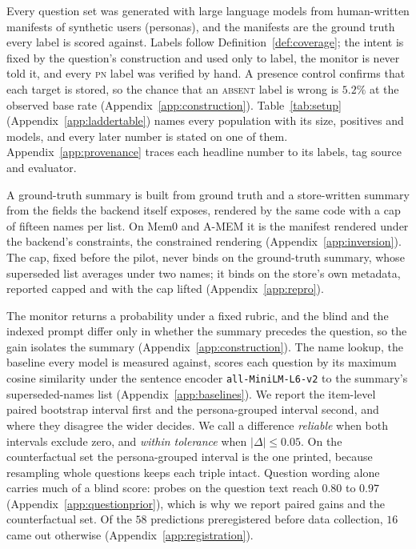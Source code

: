 \documentclass{article}
\newcommand{\absent}{\textsc{absent}}
\newcommand{\pn}{\textsc{pn}}
\begin{document}
Every question set was generated with large language models from human-written manifests of synthetic users (personas), and the manifests are the ground truth every label is scored against.
Labels follow Definition~\ref{def:coverage}; the intent is fixed by the question's construction and used only to label, the monitor is never told it, and every \pn{} label was verified by hand.
A presence control confirms that each target is stored, so the chance that an \absent{} label is wrong is $5.2\%$ at the observed base rate (Appendix~\ref{app:construction}).
Table~\ref{tab:setup} (Appendix~\ref{app:laddertable}) names every population with its size, positives and models, and every later number is stated on one of them.
Appendix~\ref{app:provenance} traces each headline number to its labels, tag source and evaluator.


A ground-truth summary is built from ground truth and a store-written summary from the fields the backend itself exposes, rendered by the same code with a cap of fifteen names per list.
On Mem0 and A-MEM it is the manifest rendered under the backend's constraints, the constrained rendering (Appendix~\ref{app:inversion}).
The cap, fixed before the pilot, never binds on the ground-truth summary, whose superseded list averages under two names; it binds on the store's own metadata, reported capped and with the cap lifted (Appendix~\ref{app:repro}).

The monitor returns a probability under a fixed rubric, and the blind and the indexed prompt differ only in whether the summary precedes the question, so the gain isolates the summary (Appendix~\ref{app:construction}).
The name lookup, the baseline every model is measured against, scores each question by its maximum cosine similarity under the sentence encoder \texttt{all-MiniLM-L6-v2} to the summary's superseded-names list (Appendix~\ref{app:baselines}).
We report the item-level paired bootstrap interval first and the persona-grouped interval second, and where they disagree the wider decides.
We call a difference \emph{reliable} when both intervals exclude zero, and \emph{within tolerance} when $|\Delta| \le 0.05$.
On the counterfactual set the persona-grouped interval is the one printed, because resampling whole questions keeps each triple intact.
Question wording alone carries much of a blind score: probes on the question text reach $0.80$ to $0.97$ (Appendix~\ref{app:questionprior}), which is why we report paired gains and the counterfactual set.
Of the $58$ predictions preregistered before data collection, $16$ came out otherwise (Appendix~\ref{app:registration}).
\end{document}
